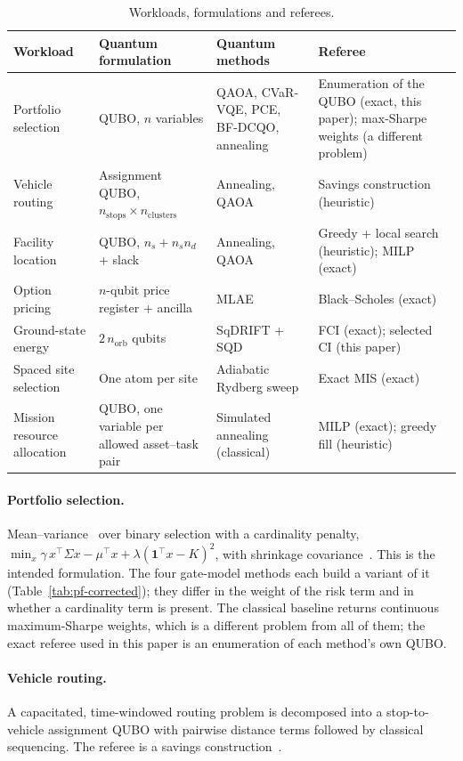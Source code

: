 \documentclass[11pt,a4paper]{article}
\begin{document}
\begin{table}[H]
\centering\small
\begin{tabular}{p{2.4cm}p{3.1cm}p{3.6cm}p{3.6cm}}
\toprule
Workload & Quantum formulation & Quantum methods & Referee \\
\midrule
Portfolio selection & QUBO, $n$ variables & QAOA, CVaR-VQE, PCE, BF-DCQO, annealing & Enumeration of the QUBO (exact, this paper); max-Sharpe weights (a different problem) \\
Vehicle routing & Assignment QUBO, $n_{\mathrm{stops}}\times n_{\mathrm{clusters}}$ & Annealing, QAOA & Savings construction (heuristic) \\
Facility location & QUBO, $n_s + n_s n_d$ + slack & Annealing, QAOA & Greedy + local search (heuristic); MILP (exact) \\
Option pricing & $n$-qubit price register + ancilla & MLAE & Black--Scholes (exact) \\
Ground-state energy & $2\,n_{\mathrm{orb}}$ qubits & SqDRIFT + SQD & FCI (exact); selected CI (this paper) \\
Spaced site selection & One atom per site & Adiabatic Rydberg sweep & Exact MIS (exact) \\
Mission resource allocation & QUBO, one variable per allowed asset--task pair & Simulated annealing (classical) & MILP (exact); greedy fill (heuristic) \\
\bottomrule
\end{tabular}
\caption{Workloads, formulations and referees.}
\label{tab:workloads}
\end{table}

\paragraph{Portfolio selection.} Mean--variance~\cite{markowitz1952} over
binary selection with a cardinality penalty,
$\min_x \gamma\, x^\top \Sigma x - \mu^\top x + \lambda (\mathbf 1^\top x - K)^2$,
with shrinkage covariance~\cite{ledoit2004}. This is the intended
formulation. The four gate-model methods each build a variant of it
(Table~\ref{tab:pf-corrected}); they differ in the weight of the risk term
and in whether a cardinality term is present. The classical baseline returns
continuous maximum-Sharpe weights, which is a different problem from all of
them; the exact referee used in this paper is an enumeration of each
method's own QUBO.

\paragraph{Vehicle routing.} A capacitated, time-windowed routing problem is
decomposed into a stop-to-vehicle assignment QUBO with pairwise distance terms
followed by classical sequencing. The referee is a savings
construction~\cite{clarke1964}.
\end{document}
